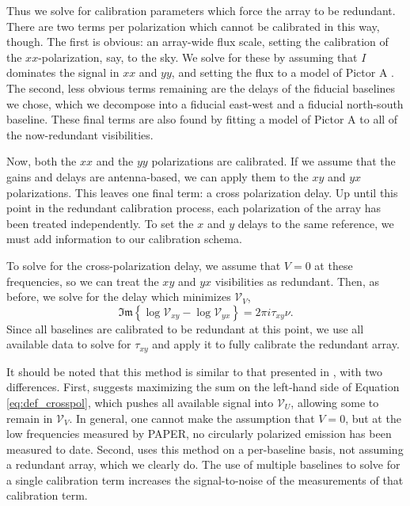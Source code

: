 Thus we solve for calibration parameters which force the array to be redundant. There are two terms
per polarization which cannot be calibrated in this way, though. The first is obvious: an array-wide
flux scale, setting the calibration of the $xx$-polarization, say, to the sky. We solve for these by
assuming that $I$ dominates the signal in $xx$ and $yy$, and setting the flux to a model of Pictor A
\cite{Jacobs2013b}. The second, less obvious terms remaining are the delays of the fiducial
baselines we chose, which we decompose into a fiducial east-west and a fiducial north-south
baseline. These final terms are also found by fitting a model of Pictor A to all of the now-redundant visibilities.

Now, both the $xx$ and the $yy$ polarizations are calibrated. If we assume that the gains and delays
are antenna-based, we can apply them to the $xy$ and $yx$ polarizations. This leaves one final term:
a cross polarization delay. Up until this point in the redundant calibration process, each polarization 
of the array has been treated independently. To set the $x$ and $y$ delays to the same reference, we
must add information to our calibration schema.

To solve for the cross-polarization delay, we assume that $V=0$ at these frequencies, so we can
treat the $xy$ and $yx$ visibilities as redundant. Then, as before, we solve for the delay which
minimizes $\mathcal{V}_V$, 
\begin{equation}
  \mathfrak{Im}\left\{\log\mathcal{V}_{xy} - \log\mathcal{V}_{yx}\right\} = 2\pi i \tau_{xy}\nu.
  \label{eq:def_crosspol}
\end{equation}
Since all baselines are calibrated to be redundant at this point, we use all available data to solve
for $\tau_{xy}$ and apply it to fully calibrate the redundant array.

It should be noted that this method is similar to that presented in \citet{Cotton2012}, with two
differences. First, \citet{Cotton2012} suggests maximizing the sum on the left-hand side of Equation
\ref{eq:def_crosspol}, which pushes all available signal into $\mathcal{V}_U$, allowing some to
remain in $\mathcal{V}_V$. In general, one cannot make the assumption that $V=0$, but at the low
frequencies measured by PAPER, no circularly polarized emission has been measured to date. Second,
\citet{Cotton2012} uses this method on a per-baseline basis, not assuming a redundant array, which
we clearly do. The use of multiple baselines to solve for a single calibration term increases the
signal-to-noise of the measurements of that calibration term.
